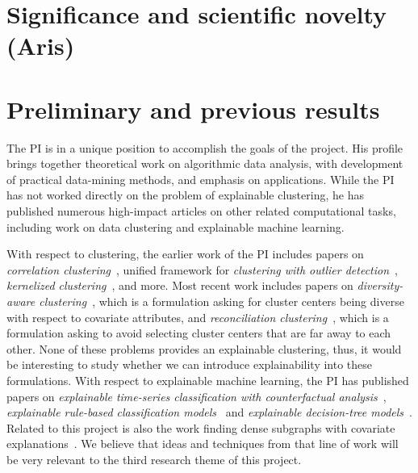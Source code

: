 \documentclass[a4paper,11pt]{article}
\begin{document}
\section{Significance and scientific novelty {\color{teal}(Aris)}}


\section{Preliminary and previous results}


The PI is in a unique position to accomplish the goals of the project. 
His profile brings together theoretical work on algorithmic data analysis, 
with development of practical data-mining methods, and emphasis on applications. 
While the PI has not worked directly on the problem of explainable clustering,
he has published numerous high-impact articles on other related computational tasks, 
including work on data clustering and explainable machine learning. 

With respect to clustering, 
the earlier work of the PI includes papers on
\emph{correlation clustering}~\cite{bonchi2013overlapping,gionis2007clustering},
unified framework for \emph{clustering with outlier detection}~\cite{chawla2013k},
\emph{kernelized clustering}~\cite{amid2015kernel}, and more.
Most recent work includes papers on
\emph{diversity-aware clustering}~\cite{thejaswi2021diversity}, 
which is a formulation asking for cluster centers being diverse with respect to covariate attributes, and
\emph{reconciliation clustering}~\cite{spoerhase2023constant}, 
which is a formulation asking to avoid selecting cluster centers that are far away to each other.
None of these problems provides an explainable clustering, 
thus, it would be interesting to study whether we can introduce explainability
into these formulations.
%
With respect to explainable machine learning, 
the PI has published papers on 
\emph{explainable time-series classification with counterfactual analysis}~\cite{karlsson2020locally},
\emph{explainable rule-based classification models}~\cite{ciaperoni2023concise,zhang2020diverse}
and 
\emph{explainable decision-tree models}~\cite{zhang2023regularized}. 
Related to this project is also the work
finding dense subgraphs with covariate explanations~\cite{galbrun2014overlapping,galbrun2016top}.
We believe that ideas and techniques from that line of work
will be very relevant to the third research theme of this project.
\end{document}
